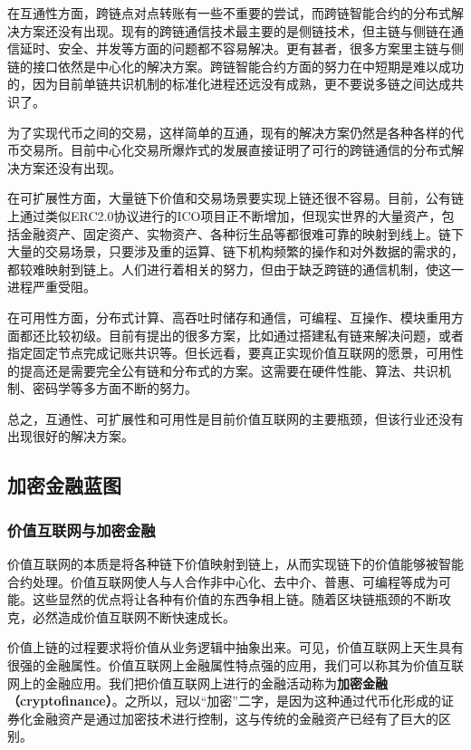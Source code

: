 \documentclass[a4paper,12pt]{article}
\begin{document}
在互通性方面，跨链点对点转账有一些不重要的尝试，而跨链智能合约的分布式解决方案还没有出现。现有的跨链通信技术最主要的是侧链技术，但主链与侧链在通信延时、安全、并发等方面的问题都不容易解决。更有甚者，很多方案里主链与侧链的接口依然是中心化的解决方案。跨链智能合约方面的努力在中短期是难以成功的，因为目前单链共识机制的标准化进程还远没有成熟，更不要说多链之间达成共识了。

为了实现代币之间的交易，这样简单的互通，现有的解决方案仍然是各种各样的代币交易所。目前中心化交易所爆炸式的发展直接证明了可行的跨链通信的分布式解决方案还没有出现。

在可扩展性方面，大量链下价值和交易场景要实现上链还很不容易。目前，公有链上通过类似ERC2.0协议进行的ICO项目正不断增加，但现实世界的大量资产，包括金融资产、固定资产、实物资产、各种衍生品等都很难可靠的映射到线上。链下大量的交易场景，只要涉及重的运算、链下机构频繁的操作和对外数据的需求的，都较难映射到链上。人们进行着相关的努力，但由于缺乏跨链的通信机制，使这一进程严重受阻。

在可用性方面，分布式计算、高吞吐时储存和通信，可编程、互操作、模块重用方面都还比较初级。目前有提出的很多方案，比如通过搭建私有链来解决问题，或者指定固定节点完成记账共识等。但长远看，要真正实现价值互联网的愿景，可用性的提高还是需要完全公有链和分布式的方案。这需要在硬件性能、算法、共识机制、密码学等多方面不断的努力。

总之，互通性、可扩展性和可用性是目前价值互联网的主要瓶颈，但该行业还没有出现很好的解决方案。

\subsection{加密金融蓝图}

\subsubsection{价值互联网与加密金融}

价值互联网的本质是将各种链下价值映射到链上，从而实现链下的价值能够被智能合约处理。价值互联网使人与人合作非中心化、去中介、普惠、可编程等成为可能。这些显然的优点将让各种有价值的东西争相上链。随着区块链瓶颈的不断攻克，必然造成价值互联网不断快速成长。

价值上链的过程要求将价值从业务逻辑中抽象出来。可见，价值互联网上天生具有很强的金融属性。价值互联网上金融属性特点强的应用，我们可以称其为价值互联网上的金融应用。我们把价值互联网上进行的金融活动称为\textbf{加密金融（cryptofinance）}。之所以，冠以“加密”二字，是因为这种通过代币化形成的证券化金融资产是通过加密技术进行控制，这与传统的金融资产已经有了巨大的区别。
\end{document}
